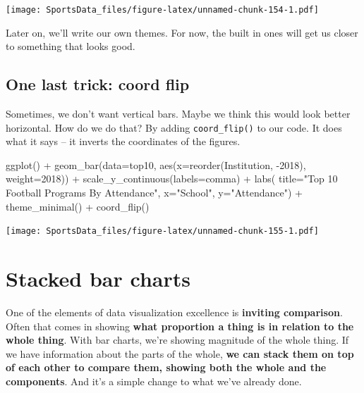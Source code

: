 \documentclass[
]{book}
\newenvironment{Shaded}{\begin{snugshade}}{\end{snugshade}}
\newcommand{\AttributeTok}[1]{\textcolor[rgb]{0.77,0.63,0.00}{#1}}
\newcommand{\FunctionTok}[1]{\textcolor[rgb]{0.00,0.00,0.00}{#1}}
\newcommand{\NormalTok}[1]{#1}
\newcommand{\SpecialCharTok}[1]{\textcolor[rgb]{0.00,0.00,0.00}{#1}}
\newcommand{\StringTok}[1]{\textcolor[rgb]{0.31,0.60,0.02}{#1}}
\begin{document}
\texttt{[image: SportsData\_files/figure-latex/unnamed-chunk-154-1.pdf]}

Later on, we'll write our own themes. For now, the built in ones will get us closer to something that looks good.

\hypertarget{one-last-trick-coord-flip}{%
\section{One last trick: coord flip}\label{one-last-trick-coord-flip}}

Sometimes, we don't want vertical bars. Maybe we think this would look better horizontal. How do we do that? By adding \texttt{coord\_flip()} to our code. It does what it says -- it inverts the coordinates of the figures.

\begin{Shaded}
\begin{Highlighting}[]
\FunctionTok{ggplot}\NormalTok{() }\SpecialCharTok{+} 
  \FunctionTok{geom\_bar}\NormalTok{(}\AttributeTok{data=}\NormalTok{top10, }\FunctionTok{aes}\NormalTok{(}\AttributeTok{x=}\FunctionTok{reorder}\NormalTok{(Institution, }\SpecialCharTok{{-}}\StringTok{\textasciigrave{}}\AttributeTok{2018}\StringTok{\textasciigrave{}}\NormalTok{), }\AttributeTok{weight=}\StringTok{\textasciigrave{}}\AttributeTok{2018}\StringTok{\textasciigrave{}}\NormalTok{)) }\SpecialCharTok{+} 
  \FunctionTok{scale\_y\_continuous}\NormalTok{(}\AttributeTok{labels=}\NormalTok{comma) }\SpecialCharTok{+} 
  \FunctionTok{labs}\NormalTok{(}
    \AttributeTok{title=}\StringTok{"Top 10 Football Programs By Attendance"}\NormalTok{, }
    \AttributeTok{x=}\StringTok{"School"}\NormalTok{, }
    \AttributeTok{y=}\StringTok{"Attendance"}\NormalTok{) }\SpecialCharTok{+} 
  \FunctionTok{theme\_minimal}\NormalTok{() }\SpecialCharTok{+} 
  \FunctionTok{coord\_flip}\NormalTok{()}
\end{Highlighting}
\end{Shaded}

\texttt{[image: SportsData\_files/figure-latex/unnamed-chunk-155-1.pdf]}

\hypertarget{stacked-bar-charts}{%
\chapter{Stacked bar charts}\label{stacked-bar-charts}}

One of the elements of data visualization excellence is \textbf{inviting comparison}. Often that comes in showing \textbf{what proportion a thing is in relation to the whole thing}. With bar charts, we're showing magnitude of the whole thing. If we have information about the parts of the whole, \textbf{we can stack them on top of each other to compare them, showing both the whole and the components}. And it's a simple change to what we've already done.
\end{document}
